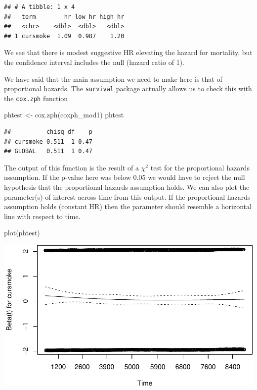 \documentclass[
]{book}
\newenvironment{Shaded}{\begin{snugshade}}{\end{snugshade}}
\newcommand{\FunctionTok}[1]{\textcolor[rgb]{0.00,0.00,0.00}{#1}}
\newcommand{\NormalTok}[1]{#1}
\newcommand{\OtherTok}[1]{\textcolor[rgb]{0.56,0.35,0.01}{#1}}
\begin{document}
\begin{verbatim}
## # A tibble: 1 x 4
##   term        hr low_hr high_hr
##   <chr>    <dbl>  <dbl>   <dbl>
## 1 cursmoke  1.09  0.987    1.20
\end{verbatim}

We see that there is modest suggestive HR elevating the hazard for mortality, but the confidence interval includes the null (hazard ratio of 1).

We have said that the main assumption we need to make here is that of proportional hazards. The \texttt{survival} package actually allows us to check this with the \texttt{cox.zph} function

\begin{Shaded}
\begin{Highlighting}[]
\NormalTok{phtest }\OtherTok{\textless{}{-}} \FunctionTok{cox.zph}\NormalTok{(coxph\_mod1)}
\NormalTok{phtest}
\end{Highlighting}
\end{Shaded}

\begin{verbatim}
##          chisq df    p
## cursmoke 0.511  1 0.47
## GLOBAL   0.511  1 0.47
\end{verbatim}

The output of this function is the result of a \(\chi^2\) test for the proportional hazards assumption. If the p-value here was below 0.05 we would have to reject the null hypothesis that the proportional hazards assumption holds.
We can also plot the parameter(s) of interest across time from this output. If the proportional hazards assumption holds (constant HR) then the parameter should resemble a horizontal line with respect to time.

\begin{Shaded}
\begin{Highlighting}[]
\FunctionTok{plot}\NormalTok{(phtest)}
\end{Highlighting}
\end{Shaded}

\includegraphics{adv_epi_analysis_files/figure-latex/unnamed-chunk-210-1.pdf}
\end{document}
